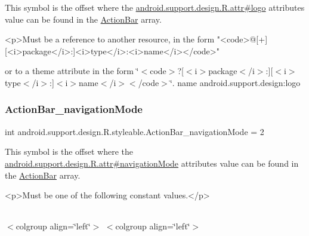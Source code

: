 This symbol is the offset where the \hyperlink{classandroid_1_1support_1_1design_1_1R_1_1attr_a71cd4cca1c1a2d4a719434831f5e0c6d}{android.\+support.\+design.\+R.\+attr\#logo} attribute\textquotesingle{}s value can be found in the \hyperlink{classandroid_1_1support_1_1design_1_1R_1_1styleable_ab795220a96557d11f8c21359b95bed82}{Action\+Bar} array.

\begin{DoxyVerb}      <p>Must be a reference to another resource, in the form "<code>@[+][<i>package</i>:]<i>type</i>:<i>name</i></code>"
\end{DoxyVerb}
 or to a theme attribute in the form \char`\"{}$<$code$>$?\mbox{[}$<$i$>$package$<$/i$>$\+:\mbox{]}\mbox{[}$<$i$>$type$<$/i$>$\+:\mbox{]}$<$i$>$name$<$/i$>$$<$/code$>$\char`\"{}.  name android.\+support.\+design\+:logo \mbox{\label{classandroid_1_1support_1_1design_1_1R_1_1styleable_a3b1d975d496c69cd5c70aa11b32bfacb}} 
\subsubsection{\texorpdfstring{Action\+Bar\+\_\+navigation\+Mode}{ActionBar\_navigationMode}}
{\footnotesize\ttfamily int android.\+support.\+design.\+R.\+styleable.\+Action\+Bar\+\_\+navigation\+Mode = 2\hspace{0.3cm}{\ttfamily [static]}}

This symbol is the offset where the \hyperlink{classandroid_1_1support_1_1design_1_1R_1_1attr_a109c739e0d040aef57bdb0c1dadb4e48}{android.\+support.\+design.\+R.\+attr\#navigation\+Mode} attribute\textquotesingle{}s value can be found in the \hyperlink{classandroid_1_1support_1_1design_1_1R_1_1styleable_ab795220a96557d11f8c21359b95bed82}{Action\+Bar} array.

\begin{DoxyVerb}      <p>Must be one of the following constant values.</p>
\end{DoxyVerb}
 \tabulinesep=1mm
\begin{longtabu} spread 0pt [c]{*{0}{|X[-1]}|}
\hline
\end{longtabu}
$<$colgroup align=\char`\"{}left\char`\"{}$>$ $<$colgroup align=\char`\"{}left\char`\"{}$>$ 

